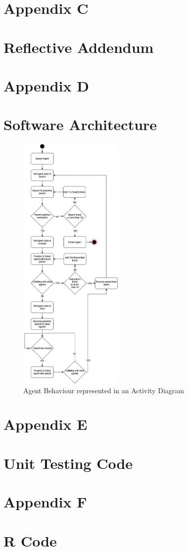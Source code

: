\newpage
\section*{Appendix C}
\section*{Reflective Addendum}
\label{append:c}

\newpage
\section*{Appendix D}
\section*{Software Architecture}
\label{append:d}
\begin{figure}[ht]
    \includegraphics[width=0.45\textwidth]{./Images/AgentActivityDiagram.png}
    \centering
    \caption{Agent Behaviour represented in an Activity Diagram}
    \label{activity-diagram}
\end{figure}

\newpage
\section*{Appendix E}
\section*{Unit Testing Code}
\label{append:e}

\newpage
\section*{Appendix F}
\section*{R Code}
\label{append:f}